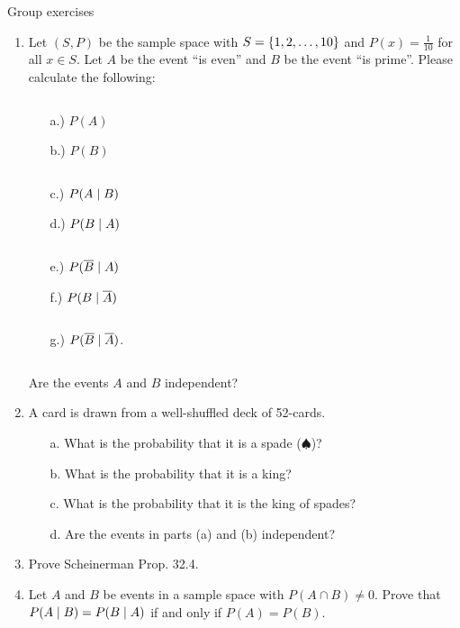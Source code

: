 \documentclass[10pt]{beamer}
\begin{document}
\begin{frame}{Group exercises}

\begin{enumerate}
	\item Let $(S,P)$ be the sample space with $S=\{ {1,2,\hdots, 10} \}$ and $P(x) =\frac{1}{10}$ for all $x \in S$.  Let $A$ be the event \enquote{is even} and $B$ be the event \enquote{is prime}.  Please calculate the following:
	\vspace{-0.5cm}
    \begin{columnsonlytextwidth}
    \begin{column}[t]{0.22\textwidth}
        \begin{itemize} \small
		\item[a.)] $P(A)$ 
		\item[b.)] $P(B)$
        \end{itemize}
    \end{column}
    \begin{column}[t]{0.22\textwidth}
        \begin{itemize} \small
      	\item[c.)] $P(A \; | \; B)$
		\item[d.)] $P(B \; | \; A)$ 
        \end{itemize}
    \end{column}
     \begin{column}[t]{0.22\textwidth}
        \begin{itemize} \small
		\item[e.)] $P(\overline{B} \; | \; A)$ 
		\item[f.)] $P(B \; | \; \overline{A})$
        \end{itemize}
    \end{column}
    \begin{column}[t]{0.22\textwidth}
        \begin{itemize} \small
		\item[g.)] $P(\overline{B} \; | \; \overline{A})$. 
        \end{itemize}
    \end{column}
    \end{columnsonlytextwidth}
    \vspace{.2cm}
     Are the events $A$ and $B$ independent?
\item A card is drawn from a well-shuffled deck of 52-cards.
	\begin{itemize}
	\item[a.] What is the probability that it is a spade ($\spadesuit$)?
	\item[b.] What is the probability that it is a king?	
	\item[c.] What is the probability that it is the king of spades?
	\item[d.] Are the events in parts (a) and (b) independent?
	\end{itemize}
\item Prove Scheinerman Prop. 32.4.
\item Let $A$ and $B$ be events in a sample space with $P(A \cap B) \neq 0$.  Prove that $P(A \; | \; B) = P(B \; | \; A)$ if and only if $P(A) = P(B)$.
\end{enumerate}


\end{frame}
\end{document}
